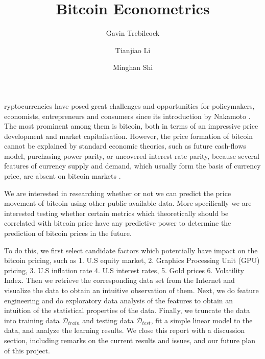 \documentclass[9pt,twocolumn,twoside]{ilcss}
\title{Bitcoin Econometrics}
\author[a]{Gavin Trebilcock}
\author[b]{Tianjiao Li}
\author[c]{Minghan Shi}
\affil[a]{gt322, Computer Science}
\affil[b]{tl787, Mechanical Engineering}
\affil[c]{ms3536, Electrical and Computer Engineering}
\begin{document}
\maketitle
\thispagestyle{firststyle}


ryptocurrencies have posed great challenges and opportunities for  policymakers, economists, entrepreneurs and consumers since its introduction by Nakamoto \cite{Dyhrberg2016}. The most prominent among them is bitcoin, both in terms of an impressive price development and market capitalisation. However, the price formation of bitcoin cannot be explained by standard economic theories, such as future cash-flows model, purchasing power parity, or uncovered interest rate parity, because several features of currency supply and demand, which usually form the basis of currency price, are absent on bitcoin markets \cite{Ciaian2016}.

We are interested in researching whether or not we can predict the price movement of bitcoin using other public available data. More specifically we are interested testing whether certain metrics which theoretically should be correlated with bitcoin price have any predictive power to determine the prediction of bitcoin prices in the future. 

To do this, we first select candidate factors which potentially have impact on the bitcoin pricing, such as 1. U.S equity market, 2. Graphics Processing Unit (GPU) pricing, 3. U.S inflation rate 4. U.S interest rates, 5. Gold prices 6. Volatility Index. Then we retrieve the corresponding data set from the Internet and visualize the data to obtain an intuitive observation of them. Next, we do feature engineering and do exploratory data analysis of the features to obtain an intuition of the statistical properties of the data. Finally, we truncate the data into training data $\mathcal{D}_{train}$ and testing data $\mathcal{D}_{test}$, fit a simple linear model to the data, and analyze the learning results. We close this report with a discussion section, including remarks on the current results and issues, and our future plan of this project.
\end{document}
